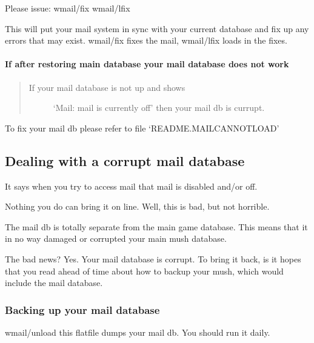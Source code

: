 \documentclass[letterpaper,10pt,english]{sphinxmanual}
\begin{document}
\sphinxAtStartPar
Please issue:
wmail/fix
wmail/lfix

\sphinxAtStartPar
This will put your mail system in sync with your current database and
fix up any errors that may exist.  wmail/fix fixes the mail, wmail/lfix
loads in the fixes.


\paragraph{If after restoring main database your mail database does not work}
\label{\detokenize{troubleshooting:if-after-restoring-main-database-your-mail-database-does-not-work}}\begin{quote}
\begin{description}
\item[{If your mail database is not up and shows}] \leavevmode
\sphinxAtStartPar
‘Mail: mail is currently off’ then your mail db is currupt.

\end{description}
\end{quote}

\sphinxAtStartPar
To fix your mail db please refer to file ‘README.MAILCANNOTLOAD’


\subsection{Dealing with a corrupt mail database}
\label{\detokenize{troubleshooting:dealing-with-a-corrupt-mail-database}}
\sphinxAtStartPar
It says when you try to access mail that mail is disabled and/or off.

\sphinxAtStartPar
Nothing you do can bring it on line.  Well, this is bad, but not horrible.

\sphinxAtStartPar
The mail db is totally separate from the main game database.  This means
that it in no way damaged or corrupted your main mush database.

\sphinxAtStartPar
The bad news?  Yes.  Your mail database is corrupt.  To bring it back,
is it hopes that you read ahead of time about how to backup your mush,
which would include the mail database.


\subsubsection{Backing up your mail database}
\label{\detokenize{troubleshooting:backing-up-your-mail-database}}
\sphinxAtStartPar
wmail/unload \textendash{} this flatfile dumps your mail db.  You should run it daily.
\end{document}
